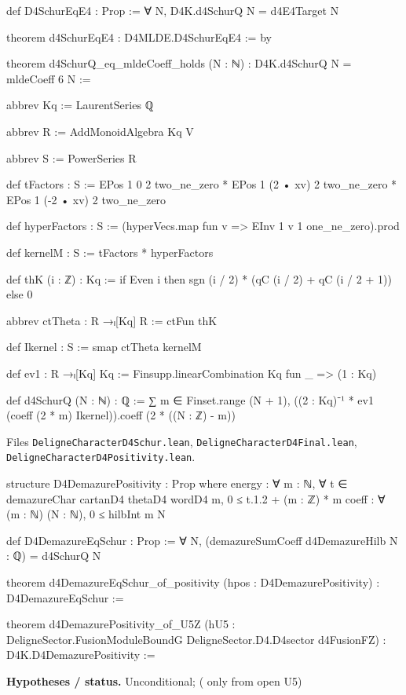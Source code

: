 \documentclass[11pt,openany]{book}
\newcommand{\lean}[1]{\texttt{\detokenize{#1}}}
\newcommand{\leanpath}[1]{\texttt{\small #1}}
\theoremstyle{definition}
\theoremstyle{plain}
\begin{document}
\begin{leancode}
def D4SchurEqE4 : Prop := ∀ N, D4K.d4SchurQ N = d4E4Target N

theorem d4SchurEqE4 : D4MLDE.D4SchurEqE4 := by

theorem d4SchurQ_eq_mldeCoeff_holds (N : ℕ) : D4K.d4SchurQ N = mldeCoeff 6 N :=
\end{leancode}
\begin{leancode}
abbrev Kq := LaurentSeries ℚ

abbrev R := AddMonoidAlgebra Kq V

abbrev S := PowerSeries R

def tFactors : S :=
  EPos 1 0 2 two_ne_zero * EPos 1 (2 • xv) 2 two_ne_zero * EPos 1 (-2 • xv) 2 two_ne_zero

def hyperFactors : S := (hyperVecs.map fun v => EInv 1 v 1 one_ne_zero).prod

def kernelM : S := tFactors * hyperFactors

def thK (i : ℤ) : Kq := if Even i then sgn (i / 2) * (qC (i / 2) + qC (i / 2 + 1)) else 0

abbrev ctTheta : R →ₗ[Kq] R := ctFun thK

def Ikernel : S := smap ctTheta kernelM

def ev1 : R →ₗ[Kq] Kq := Finsupp.linearCombination Kq fun _ => (1 : Kq)

def d4SchurQ (N : ℕ) : ℚ :=
  ∑ m ∈ Finset.range (N + 1), ((2 : Kq)⁻¹ * ev1 (coeff (2 * m) Ikernel)).coeff (2 * ((N : ℤ) - m))
\end{leancode}
{\raggedright\noindent Files \leanpath{DeligneCharacterD4Schur.lean}, \leanpath{DeligneCharacterD4Final.lean},
\leanpath{DeligneCharacterD4Positivity.lean}.\par}
\begin{leancode}
structure D4DemazurePositivity : Prop where
  energy : ∀ m : ℕ, ∀ t ∈ demazureChar cartanD4 thetaD4 wordD4 m, 0 ≤ t.1.2 + (m : ℤ) * m
  coeff : ∀ (m : ℕ) (N : ℕ), 0 ≤ hilbInt m N

def D4DemazureEqSchur : Prop := ∀ N, (demazureSumCoeff d4DemazureHilb N : ℚ) = d4SchurQ N

theorem d4DemazureEqSchur_of_positivity (hpos : D4DemazurePositivity) : D4DemazureEqSchur :=

theorem d4DemazurePositivity_of_U5Z
    (hU5 : DeligneSector.FusionModuleBoundG DeligneSector.D4.D4sector d4FusionFZ) :
    D4K.D4DemazurePositivity :=
\end{leancode}
\noindent\textbf{Hypotheses / status.} Unconditional; \lean{D4DemazurePositivity} (\lean{coeff} only from open U5)\par
\medskip
\endgroup
\setcounter{chapter}{25}
\end{document}
